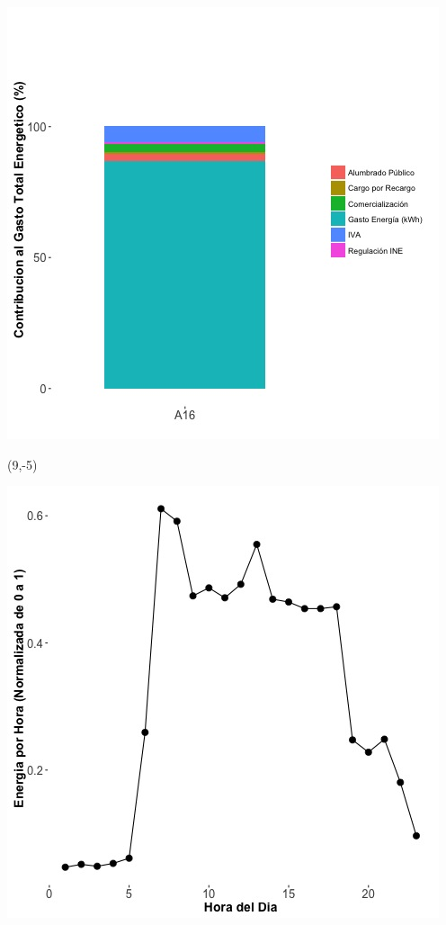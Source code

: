 \documentclass{article}\usepackage[]{graphicx}\usepackage[]{color}
\newenvironment{knitrout}{}{} %
\begin{document}
\begin{knitrout}
\color{fgcolor}
\includegraphics[scale=0.65]{figure/A16_costvars_plot.jpg} 
\end{knitrout}

 \begin{textblock}{1}(9,-5)
\begin{minipage}{20em}
\begingroup

\endgroup
\end{minipage}
\end{textblock}

\begin{knitrout}
\color{fgcolor}
\includegraphics[scale=0.65]{figure/A16_plot_norm_median} 
\end{knitrout}
\end{document}
